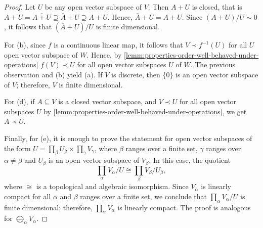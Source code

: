 \begin{proof}
	Let $U$ be any open vector subspace of $V$. Then $A + U$ is closed, that is $A + U = \overline{A + U} \supseteq \overline{A} + U \supseteq A + U$. Hence, $\overline{A} + U = A + U$. Since $(A + U)/U \sim 0$, it follows that $(\overline{A} + U)/U$ is finite dimensional. 

	For (b), since $f$ is a continuous linear map, it follows that $V \prec f^{-1}(U)$ for all $U$ open vector subspace of $W$. Hence, by \cref{lemm:properties-order-well-behaved-under-operations} $f(V) \prec U$ for all open vector subspaces $U$ of $W$. The previous observation and (b) yield (a). If $V$ is discrete, then $\{0\}$ is an open vector subspace of $V$; therefore, $V$ is finite dimensional.

	For (d), if $A \subseteq V$ is a closed vector subspace, and $V \prec U$ for all open vector subspaces $U$ by \cref{lemm:properties-order-well-behaved-under-operations}, we get $A \prec U$. 

	Finally, for (e), it is enough to prove the statement for open vector subspaces of the form $U = \prod_{\beta} U_{\beta} \times \prod_{\gamma} V_{\gamma}$, where $\beta$ ranges over a finite set, $\gamma$ ranges over $\alpha \neq \beta$ and $U_{\beta}$ is an open vector subspace of $V_{\beta}$. In this case, the quotient
	\[
		\prod_{\alpha}V_{\alpha} / U \cong \prod_{\beta} V_{\beta}/U_{\beta},
	\]
	where $\cong$ is a topological and algebraic isomorphism. Since $V_{\alpha}$ is linearly compact for all $\alpha$ and $\beta$ ranges over a finite set, we conclude that $\prod_{\alpha} V_{\alpha} / U$ is finite dimensional; therefore, $\prod_{\alpha} V_{\alpha}$ is linearly compact. The proof is analogous for $\bigoplus_{\alpha} V_{\alpha}$.
\end{proof} 
